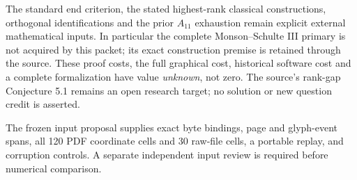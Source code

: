 \documentclass[11pt,a4paper]{article}
\begin{document}
The standard end criterion, the stated highest-rank classical constructions,
orthogonal identifications and the prior $A_{11}$ exhaustion remain explicit
external mathematical inputs. In particular the complete Monson--Schulte III
primary is not acquired by this packet; its exact construction premise is
retained through the source. These proof costs, the full graphical cost,
historical software cost and a complete formalization have value
\emph{unknown}, not zero. The source's rank-gap Conjecture 5.1 remains an
open research target; no solution or new question credit is asserted.

The frozen input proposal supplies exact byte bindings, page and glyph-event
spans, all 120 PDF coordinate cells and 30 raw-file cells, a portable replay,
and corruption controls. A separate independent input review is required
before numerical comparison.
\end{document}
